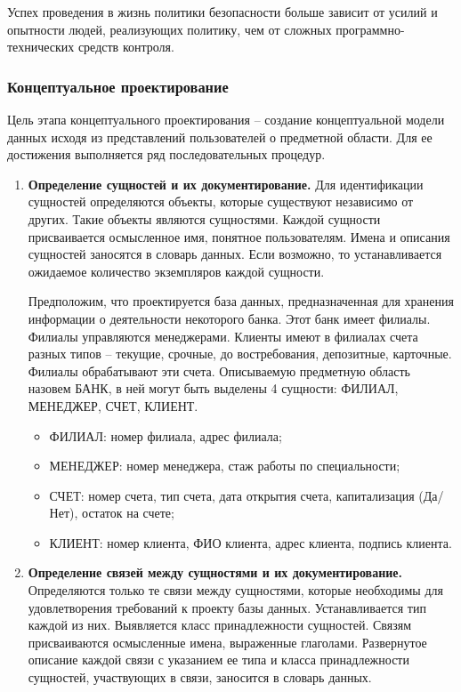 Успех проведения в жизнь политики безопасности больше зависит от усилий и опытности людей, реализующих политику,
чем от сложных программно-технических средств контроля.

\subsubsection{Концептуальное проектирование}

Цель этапа концептуального проектирования – создание концептуальной модели данных исходя из представлений
пользователей о предметной области. Для ее достижения выполняется ряд последовательных процедур.
\begin{enumerate}
	\item \textbf{Определение сущностей и их документирование.}
	Для идентификации сущностей определяются объекты, которые существуют независимо от других. Такие объекты
	являются сущностями. Каждой сущности присваивается осмысленное имя, понятное пользователям. Имена и
	описания сущностей заносятся в словарь данных. Если возможно, то устанавливается ожидаемое количество
	экземпляров каждой сущности.
	
	Предположим, что проектируется база данных, предназначенная для хранения информации о деятельности некоторого банка. Этот банк
	имеет филиалы. Филиалы управляются менеджерами. Клиенты имеют в филиалах счета разных типов – текущие, срочные, до востребования, депозитные, карточные.
	Филиалы обрабатывают эти счета. Описываемую предметную область назовем БАНК, в ней могут быть выделены 4 сущности: ФИЛИАЛ, МЕНЕДЖЕР, СЧЕТ, КЛИЕНТ.
	\begin{itemize}
		
		\item ФИЛИАЛ: номер филиала, адрес филиала;
		
		\item МЕНЕДЖЕР: номер менеджера, стаж работы по специальности;
		
		\item СЧЕТ: номер счета, тип счета, дата открытия счета, капитализация (Да/Нет), остаток на счете;
		
		\item КЛИЕНТ: номер клиента, ФИО клиента, адрес клиента, подпись клиента.
		
	\end{itemize}
	
	\item \textbf{Определение связей между сущностями и их документирование.}
	Определяются только те связи между сущностями, которые необходимы для удовлетворения требований к проекту
	базы данных. Устанавливается тип каждой из них. Выявляется класс принадлежности сущностей. Связям
	присваиваются осмысленные имена, выраженные глаголами. Развернутое описание каждой связи с указанием ее
	типа и класса принадлежности сущностей, участвующих в связи, заносится в словарь данных.
	

\end{enumerate}
